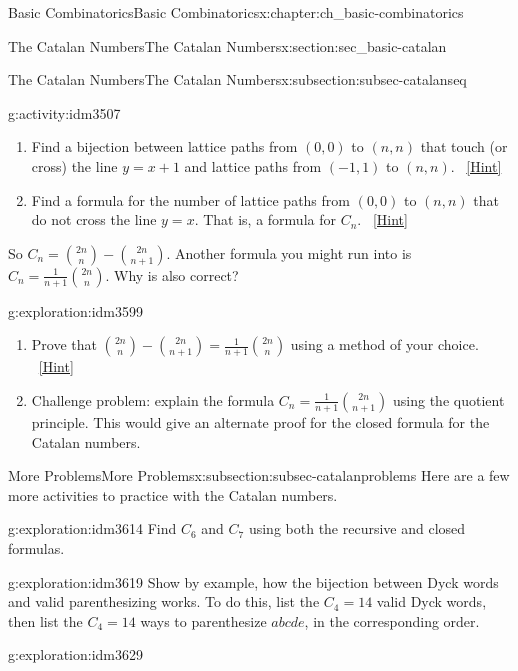 \documentclass[oneside,10pt,]{book}
\numberwithin{equation}{chapter}
\begin{document}
\begin{chapterptx}{Basic Combinatorics}{}{Basic Combinatorics}{}{}{x:chapter:ch_basic-combinatorics}
\begin{sectionptx}{The Catalan Numbers}{}{The Catalan Numbers}{}{}{x:section:sec_basic-catalan}
\begin{subsectionptx}{The Catalan Numbers}{}{The Catalan Numbers}{}{}{x:subsection:subsec-catalanseq}
\begin{activity}{}{g:activity:idm3507}
\begin{enumerate}[font=\bfseries,label=(\alph*),ref=\alph*]
\item{}Find a bijection between lattice paths from \((0,0)\) to \((n,n)\) that touch (or cross) the line \(y=x+1\) and lattice paths from \((-1,1)\) to \((n,n)\).%
\qquad~\hfill{\tiny\hyperlink{g:hint:idm3545-back}{[Hint]}}\item{}Find a formula for the number of lattice paths from \((0,0)\) to \((n,n)\) that do not cross the line \(y=x\). That is, a formula for \(C_n\).%
\qquad~\hfill{\tiny\hyperlink{g:hint:idm3590-back}{[Hint]}}\end{enumerate}
\end{activity}
So \(C_n = \binom{2n}{n} - \binom{2n}{n+1}\).  Another formula you might run into is \(C_n = \frac{1}{n+1}\binom{2n}{n}\).  Why is also correct?%
\begin{exploration}{}{g:exploration:idm3599}%
\begin{enumerate}[font=\bfseries,label=(\alph*),ref=\alph*]
\item{}Prove that \(\binom{2n}{n} - \binom{2n}{n+1} = \frac{1}{n+1}\binom{2n}{n}\) using a method of your choice.%
\qquad~\hfill{\tiny\hyperlink{g:hint:idm3604-back}{[Hint]}}\item{}Challenge problem: explain the formula \(C_n = \frac{1}{n+1}\binom{2n}{n+1}\) using the quotient principle.  This would give an alternate proof for the closed formula for the Catalan numbers.%
\end{enumerate}
\end{exploration}
\end{subsectionptx}
%
%
\typeout{************************************************}
\typeout{************************************************}
%
\begin{subsectionptx}{More Problems}{}{More Problems}{}{}{x:subsection:subsec-catalanproblems}
Here are a few more activities to practice with the Catalan numbers.%
\begin{exploration}{}{g:exploration:idm3614}%
Find \(C_6\) and \(C_7\) using both the recursive and closed formulas.%
\end{exploration}
\begin{exploration}{}{g:exploration:idm3619}%
Show by example, how the bijection between Dyck words and valid parenthesizing works.  To do this, list the \(C_4 = 14\) valid Dyck words, then list the \(C_4 = 14\) ways to parenthesize \(abcde\), in the corresponding order.%
\end{exploration}
\begin{exploration}{}{g:exploration:idm3629}%

\end{exploration}
\end{subsectionptx}
\end{sectionptx}
\end{chapterptx}
\end{document}

